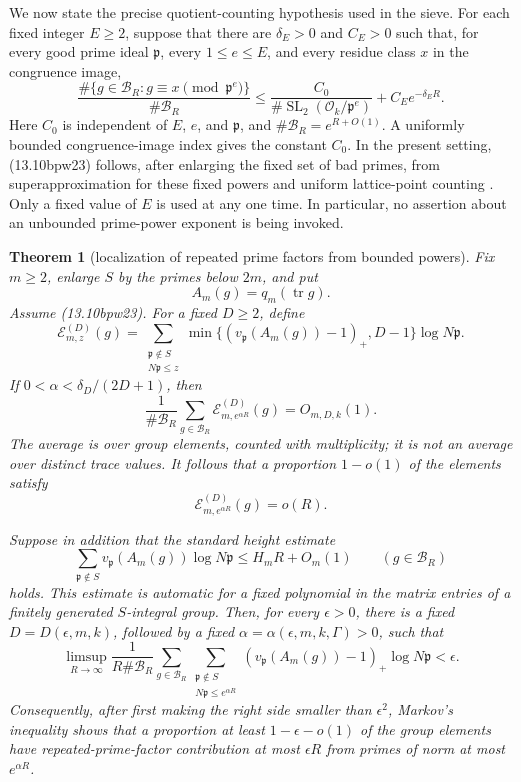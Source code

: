 \documentclass[11pt,reqno]{amsart}
\newtheorem{theorem}{Theorem}[section]
\theoremstyle{definition}
\theoremstyle{remark}
\newcommand{\cO}{\mathcal O}
\newcommand{\Tr}{\operatorname{tr}}
\newcommand{\SL}{\operatorname{SL}}
\begin{document}
We now state the precise quotient-counting hypothesis used in the sieve.
For each fixed integer \(E\ge2\), suppose that there are
\(\delta_E>0\) and \(C_E>0\) such that, for every good prime ideal
\(\mathfrak p\), every \(1\le e\le E\), and every residue class \(x\) in
the congruence image,
\[
 \frac{\#\{g\in\mathcal B_R:g\equiv x\pmod{\mathfrak p^e}\}}
      {\#\mathcal B_R}
 \le \frac{C_0}{\#\SL_2(\cO_k/\mathfrak p^e)}
       +C_Ee^{-\delta_E R}.
\tag{13.10bpw23}
\]
Here \(C_0\) is independent of \(E\), \(e\), and \(\mathfrak p\), and
\(\#\mathcal B_R=e^{R+O(1)}\).  A uniformly bounded congruence-image
index gives the constant \(C_0\).  In the present setting,
(13.10bpw23) follows, after enlarging the fixed set of bad primes, from
superapproximation for these fixed powers and uniform lattice-point counting
\cite{SalehiSuperII,GorodnikNevoCounting}.  Only a fixed value of \(E\)
is used at any one time.  In particular, no assertion about an unbounded
prime-power exponent is being invoked.

\begin{theorem}[localization of repeated prime factors from bounded powers]
\label{thm:bounded-power-squareful-localization}
Fix \(m\ge2\), enlarge \(S\) by the primes below \(2m\), and put
\[
 A_m(g)=q_m(\Tr g).
\]
Assume (13.10bpw23).  For a fixed \(D\ge2\), define
\[
 \mathcal E^{(D)}_{m,z}(g)=
 \sum_{\substack{\mathfrak p\notin S\\N\mathfrak p\le z}}
 \min\{(v_{\mathfrak p}(A_m(g))-1)_+,D-1\}
       \log N\mathfrak p.
\tag{13.10bpw24}
\]
If \(0<\alpha<\delta_D/(2D+1)\), then
\[
 \frac1{\#\mathcal B_R}\sum_{g\in\mathcal B_R}
 \mathcal E^{(D)}_{m,e^{\alpha R}}(g)
 =O_{m,D,k}(1).
\tag{13.10bpw25}
\]
The average is over group elements, counted with multiplicity; it is not
an average over distinct trace values.  It follows that a proportion
\(1-o(1)\) of the elements satisfy
\[
 \mathcal E^{(D)}_{m,e^{\alpha R}}(g)=o(R).
\tag{13.10bpw26}
\]

Suppose in addition that the standard height estimate
\[
 \sum_{\mathfrak p\notin S}
 v_{\mathfrak p}(A_m(g))\log N\mathfrak p
 \le H_mR+O_m(1)\qquad(g\in\mathcal B_R)
\tag{13.10bpw27}
\]
holds.  This estimate is automatic for a fixed polynomial in the matrix
entries of a finitely generated \(S\)-integral group.  Then, for every
\(\epsilon>0\), there is a fixed \(D=D(\epsilon,m,k)\), followed by a
fixed \(\alpha=\alpha(\epsilon,m,k,\Gamma)>0\), such that
\[
 \limsup_{R\to\infty}\frac1{R\#\mathcal B_R}
 \sum_{g\in\mathcal B_R}
 \sum_{\substack{\mathfrak p\notin S\\
                  N\mathfrak p\le e^{\alpha R}}}
 (v_{\mathfrak p}(A_m(g))-1)_+\log N\mathfrak p
 <\epsilon.
\tag{13.10bpw28}
\]
Consequently, after first making the right side smaller than
\(\epsilon^2\), Markov's inequality shows that a proportion at least
\(1-\epsilon-o(1)\) of the group elements have repeated-prime-factor
contribution at most \(\epsilon R\) from primes of norm at most
\(e^{\alpha R}\).
\end{theorem}
\end{document}
